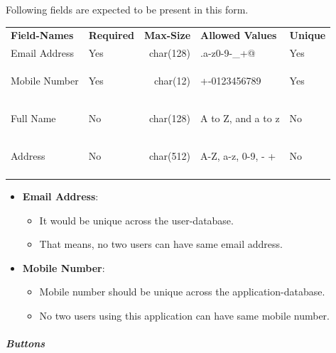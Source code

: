 \documentclass{article}%
\newcommand\margincomment[1]{\RaggedRight{\marginpar{\hsize1.7in\tiny\color{mccol}{#1}}}}%
\begin{document}
%
Following fields are expected to be present in this form.%
\par%
\vspace{0.5\baselineskip}%
\begin{longtable}[c]{llrll}%
\arrayrulecolor{cornflowerblue}%
\hline%
\rowcolor{babyblueeyes!60}%

\small{\color{darkblue}%
\textsf{\textbf{Field{-}Names}}}&
\small{\color{darkblue}%
\textsf{\textbf{Required}}}&
\small{\color{darkblue}%
\textsf{\textbf{Max{-}Size}}}&
\small{\color{darkblue}%
\textsf{\textbf{Allowed Values}}}&
\small{\color{darkblue}%
\textsf{\textbf{Unique}}}\\%
\arrayrulecolor{cornflowerblue}%
\hline%
\hypertarget{ID:1704485931}{}%
\hypertarget{ID:7222657}{}%
\hypertarget{ID:1247841701}{}%
\hypertarget{ID:877938460}{}%
\hypertarget{ID:635656157}{}%
\small{Email Address}&\small{Yes}&\small{char(128)}&\small{.a{-}z0{-}9{-}\_+@}&\small{Yes}\\%
\hypertarget{ID:1429610052}{}%
\hypertarget{ID:1469988345}{}%
\hypertarget{ID:1156785736}{}%
\hypertarget{ID:707937760}{}%
\hypertarget{ID:1488265487}{}%
\small{Mobile Number}&\small{Yes}&\small{char(12)}&\small{+{-}0123456789}&\small{Yes}\\%
\hypertarget{ID:1876960572}{}%
\hypertarget{ID:300463963}{}%
\hypertarget{ID:640962968}{}%
\hypertarget{ID:1236504577}{}%
\hypertarget{ID:1038265002}{}%
\small{Full Name}&\small{No}&\small{char(128)}&\small{A to Z, and a to z}&\small{No}\\%
\hypertarget{ID:615179840}{}%
\hypertarget{ID:464726609}{}%
\hypertarget{ID:1132425753}{}%
\hypertarget{ID:213268044}{}%
\hypertarget{ID:1732362812}{}%
\small{Address}&\small{No}&\small{char(512)}&\small{A{-}Z, a{-}z, 0{-}9, {-} +}&\small{No}\\%
\arrayrulecolor{cornflowerblue}%
\hline%
\end{longtable}%
\margincomment{\tiny{$\Lsh$ \hyperlink{ID:678039943}{Row 1}}}%
{\footnotesize%
\begin{itemize}%
\item%
\textbf{Email Address}: %
\begin{itemize}%
\item%
It would be unique across the user{-}database.%
\item%
That means, no two users can have same email address.%
\end{itemize}%
\item%
\textbf{Mobile Number}: %
\begin{itemize}%
\item%
Mobile number should be unique across the application{-}database.%
\item%
No two users using this application can have same mobile number.%
\end{itemize}%
\end{itemize}%
}%
\hypertarget{ID:303877642}{}%
\subparagraph{Buttons}%
\end{document}
